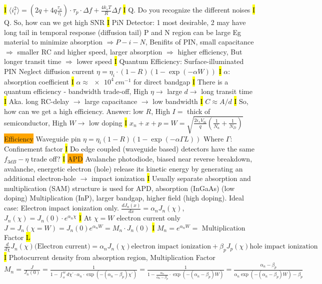\documentclass[fontsize=3]{scrartcl}
\begin{document}
\hl{I}
$\langle i_i^2 \rangle = (2q + 4q \frac{\tau_n}{\tau_t})\cdot \tau_p \cdot \Delta f + \frac{4 k_s T}{R} \Delta f $
\hl{I}
Q. Do you recognize the different noises
\hl{I}
Q. So, how can we get high SNR
\hl{I}
PiN Detector: 1 most desirable, 2 may have long tail in temporal response (diffusion tail) 
P and N region can be large Eg material to minimize absorption $\Rightarrow P-i-N $, Benifits of PIN, small capacitance $ \Rightarrow $ smaller RC and higher speed, larger absorption $ \Rightarrow $ higher efficiency, But longer transit time $ \Rightarrow $ lower speed
\hl{I}
Quantum Efficiency: Surface-illuminated PIN Neglect diffusion current $\eta = \eta_i \cdot (1-R)(1-\exp(- \alpha W))$
\hl{I}
$\alpha: $ absorption coefficient 
\hl{I}
$\alpha \approx \SI{e4}{     cm^{-1}    } $ for direct bandgap
\hl{I}
There is a quantum efficiency - bandwidth trade-off, High $\eta \rightarrow $ large $d \rightarrow$ long transit time
\hl{I}
Aka. long RC-delay $\rightarrow $ large capacitance $ \rightarrow$ low bandwidth
\hl{I}
$C \approx A/d$
\hl{I}
So, how can we get a high efficiency. Answer: low $R$, High $I =$ thick of semiconductor, High $W \rightarrow $ low doping
\hl{I}
$x_n + x+p = W = \sqrt{\frac{2 \epsilon_s V_{bi}}{q} (\frac{1}{N_a}+\frac{1}{N_D}) }$
\colorbox{Orange}{Efficiency}
Waveguide pin $\eta = \eta_i (1-R)(1-\exp(-\alpha \Gamma L))$ Where $\Gamma$: Confinement factor 
\hl{I}
Do edge coupled (waveguide based) detectors have the same $f_{3dB} - \eta$ trade off?
\hl{I}
\colorbox{Orange}{APD}
Avalanche photodiode, biased near reverse breakdown, avalanche, energetic electron (hole) release its kinetic energy by generating an additional electron-hole $\rightarrow$ impact ionization
\hl{I}
Usually separate absorption and multiplication (SAM) structure is used for APD, absorption (InGaAs) (low doping) Multiplication (InP), larger bandgap, higher field (high doping). Ideal case: Electron impact ionization only. $\frac{dJ_n(x)}{dx} = \alpha_n J_n(\chi)$, $J_n(\chi)  = J_n(0) \cdot e^{\alpha_n \chi}$
\hl{I}
At $\chi = W$ electron current only $J = J_n(\chi = W) = J_n(0)e^{\alpha_n W} = M_n \cdot J_n(0)$
\hl{I}
$M_n = e^{\alpha_n W} = $ Multiplication Factor
\hl{L}
$\frac{d}{d \chi} J_n(\chi) \text{(Electron current)} = \alpha_n J_n(\chi) \text{electron impact ionization} + \beta_p J_p (\chi) \text{hole impact ionization}$
\hl{I}
Photocurrent density from absorption region, Multiplication Factor $M_n = \frac{J}{J_n(0)} = \frac{1}{1 - \int_o^w d \chi^{\prime} \cdot \alpha_n \cdot \exp( - (\alpha_n - \beta_p) \chi^{\prime} ) } = \frac{1}{1 - \frac{\alpha_n}{\alpha_n - \beta_p} \cdot \exp( - (\alpha_n - \beta_p) W ) } =  \frac{\alpha_n - \beta_p}{\alpha_n \exp( - (\alpha_n - \beta_p) W ) - \beta_p} $
\end{document}
